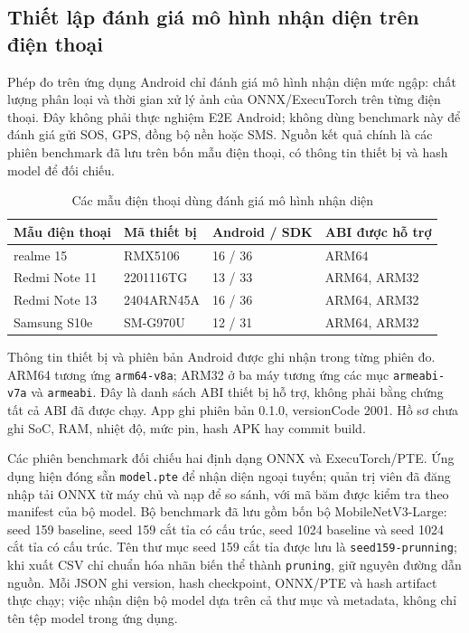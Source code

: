 \subsection{Thiết lập đánh giá mô hình nhận diện trên điện thoại}\label{sec:phone-benchmark-setup}
Phép đo trên ứng dụng Android chỉ đánh giá mô hình nhận diện mức ngập: chất lượng phân loại và thời gian xử lý ảnh của ONNX/ExecuTorch trên từng điện thoại. Đây không phải thực nghiệm E2E Android; không dùng benchmark này để đánh giá gửi SOS, GPS, đồng bộ nền hoặc SMS. Nguồn kết quả chính là các phiên benchmark đã lưu trên bốn mẫu điện thoại, có thông tin thiết bị và hash model để đối chiếu.

\begin{table}[H]\centering
\caption{Các mẫu điện thoại dùng đánh giá mô hình nhận diện}
\label{tab:phone-benchmark-devices}
\begin{tabular}{P{.27\textwidth}P{.24\textwidth}P{.18\textwidth}P{.18\textwidth}}
\toprule Mẫu điện thoại & Mã thiết bị & Android / SDK & ABI được hỗ trợ \\
\midrule
realme 15 & RMX5106 & 16 / 36 & ARM64 \\
Redmi Note 11 & 2201116TG & 13 / 33 & ARM64, ARM32 \\
Redmi Note 13 & 2404ARN45A & 16 / 36 & ARM64, ARM32 \\
Samsung S10e & SM-G970U & 12 / 31 & ARM64, ARM32 \\
\bottomrule
\end{tabular}
\end{table}
Thông tin thiết bị và phiên bản Android được ghi nhận trong từng phiên đo. ARM64 tương ứng \texttt{arm64-v8a}; ARM32 ở ba máy tương ứng các mục \texttt{armeabi-v7a} và \texttt{armeabi}. Đây là danh sách ABI thiết bị hỗ trợ, không phải bằng chứng tất cả ABI đã được chạy. App ghi phiên bản 0.1.0, versionCode 2001. Hồ sơ chưa ghi SoC, RAM, nhiệt độ, mức pin, hash APK hay commit build.

Các phiên benchmark đối chiếu hai định dạng ONNX và ExecuTorch/PTE. Ứng dụng hiện đóng sẵn \texttt{model.pte} để nhận diện ngoại tuyến; quản trị viên đã đăng nhập tải ONNX từ máy chủ và nạp để so sánh, với mã băm được kiểm tra theo manifest của bộ model. Bộ benchmark đã lưu gồm bốn bộ MobileNetV3-Large: seed 159 baseline, seed 159 cắt tỉa có cấu trúc, seed 1024 baseline và seed 1024 cắt tỉa có cấu trúc. Tên thư mục seed 159 cắt tỉa được lưu là \texttt{seed159-prunning}; khi xuất CSV chỉ chuẩn hóa nhãn biến thể thành \texttt{pruning}, giữ nguyên đường dẫn nguồn. Mỗi JSON ghi version, hash checkpoint, ONNX/PTE và hash artifact thực chạy; việc nhận diện bộ model dựa trên cả thư mục và metadata, không chỉ tên tệp model trong ứng dụng.

